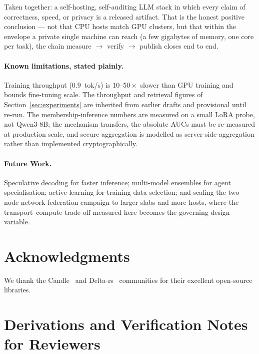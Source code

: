 \documentclass[11pt,a4paper]{article}
\theoremstyle{plain}
\theoremstyle{definition}
\begin{document}
Taken together: a self-hosting, self-auditing LLM stack in which every
claim of correctness, speed, or privacy is a released artifact. That is
the honest positive conclusion --- not that CPU hosts match GPU clusters,
but that within the envelope a private single machine can reach (a few
gigabytes of memory, one core per task), the chain measure $\to$ verify
$\to$ publish closes end to end.

\paragraph{Known limitations, stated plainly.} Training throughput
($0.9$\ tok/s) is $10$--$50\times$ slower than GPU training and bounds
fine-tuning scale. The throughput and retrieval figures of
Section~\ref{sec:experiments} are inherited from earlier drafts and
provisional until re-run. The membership-inference numbers are measured on
a small LoRA probe, not Qwen3-8B; the mechanism transfers, the absolute
AUCs must be re-measured at production scale, and secure aggregation is
modelled as server-side aggregation rather than implemented
cryptographically.

\paragraph{Future Work.} Speculative decoding for faster inference;
multi-model ensembles for agent specialisation; active learning for
training-data selection; and scaling the two-node network-federation
campaign to larger slabs and more hosts, where the transport--compute
trade-off measured here becomes the governing design variable.

\section*{Acknowledgments}

We thank the Candle~\cite{candle} and Delta-rs~\cite{deltars} communities
for their excellent open-source libraries.

\appendix





\section{Derivations and Verification Notes for Reviewers}
\label{app:derivations}
\end{document}
